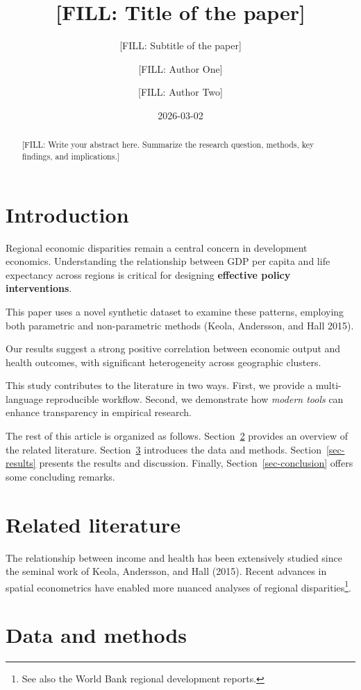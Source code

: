 \documentclass[
  letterpaper,
  DIV=11,
  numbers=noendperiod]{scrartcl}
\title{{[}FILL: Title of the paper{]}}
\subtitle{{[}FILL: Subtitle of the paper{]}}
\author{{[}FILL: Author One{]} \and {[}FILL: Author Two{]}}
\date{2026-03-02}
\begin{document}
\maketitle
\begin{abstract}
{[}FILL: Write your abstract here. Summarize the research question,
methods, key findings, and implications.{]}
\end{abstract}


\section{Introduction}\label{sec-introduction}

Regional economic disparities remain a central concern in development
economics. Understanding the relationship between GDP per capita and
life expectancy across regions is critical for designing
\textbf{effective policy interventions}.

This paper uses a novel synthetic dataset to examine these patterns,
employing both parametric and non-parametric methods (Keola, Andersson,
and Hall 2015).

Our results suggest a strong positive correlation between economic
output and health outcomes, with significant heterogeneity across
geographic clusters.

This study contributes to the literature in two ways. First, we provide
a multi-language reproducible workflow. Second, we demonstrate how
\emph{modern tools} can enhance transparency in empirical research.

The rest of this article is organized as follows.
Section~\ref{sec-literature} provides an overview of the related
literature. Section~\ref{sec-data} introduces the data and methods.
Section~\ref{sec-results} presents the results and discussion. Finally,
Section~\ref{sec-conclusion} offers some concluding remarks.

\section{Related literature}\label{sec-literature}

The relationship between income and health has been extensively studied
since the seminal work of Keola, Andersson, and Hall (2015). Recent
advances in spatial econometrics have enabled more nuanced analyses of
regional disparities\footnote{See also the World Bank regional
  development reports.}.

\section{Data and methods}\label{sec-data}
\end{document}
